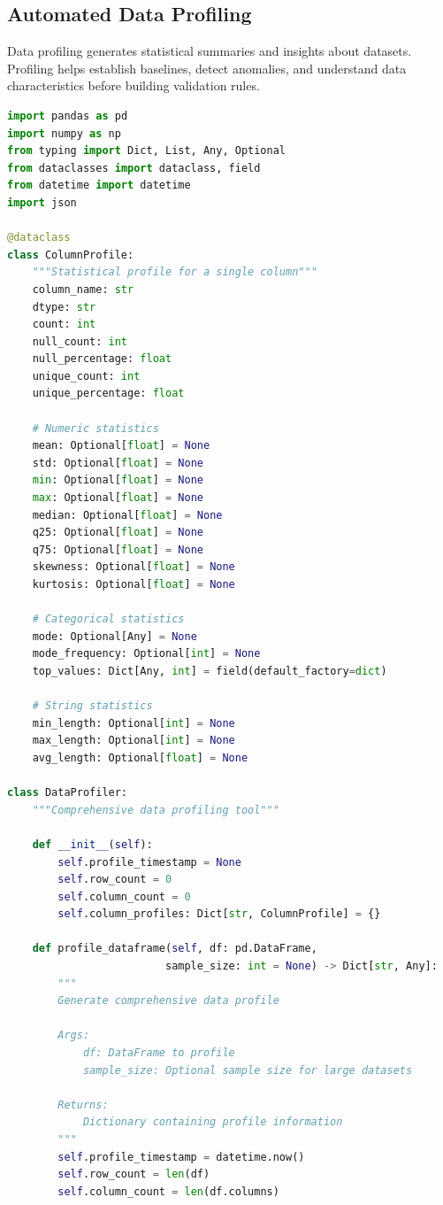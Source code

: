 \subsection{Automated Data Profiling}

Data profiling generates statistical summaries and insights about datasets. Profiling helps establish baselines, detect anomalies, and understand data characteristics before building validation rules.

\begin{lstlisting}[language=Python, caption=Comprehensive Data Profiling Framework]
import pandas as pd
import numpy as np
from typing import Dict, List, Any, Optional
from dataclasses import dataclass, field
from datetime import datetime
import json

@dataclass
class ColumnProfile:
    """Statistical profile for a single column"""
    column_name: str
    dtype: str
    count: int
    null_count: int
    null_percentage: float
    unique_count: int
    unique_percentage: float

    # Numeric statistics
    mean: Optional[float] = None
    std: Optional[float] = None
    min: Optional[float] = None
    max: Optional[float] = None
    median: Optional[float] = None
    q25: Optional[float] = None
    q75: Optional[float] = None
    skewness: Optional[float] = None
    kurtosis: Optional[float] = None

    # Categorical statistics
    mode: Optional[Any] = None
    mode_frequency: Optional[int] = None
    top_values: Dict[Any, int] = field(default_factory=dict)

    # String statistics
    min_length: Optional[int] = None
    max_length: Optional[int] = None
    avg_length: Optional[float] = None

class DataProfiler:
    """Comprehensive data profiling tool"""

    def __init__(self):
        self.profile_timestamp = None
        self.row_count = 0
        self.column_count = 0
        self.column_profiles: Dict[str, ColumnProfile] = {}

    def profile_dataframe(self, df: pd.DataFrame,
                         sample_size: int = None) -> Dict[str, Any]:
        """
        Generate comprehensive data profile

        Args:
            df: DataFrame to profile
            sample_size: Optional sample size for large datasets

        Returns:
            Dictionary containing profile information
        """
        self.profile_timestamp = datetime.now()
        self.row_count = len(df)
        self.column_count = len(df.columns)


\end{lstlisting}
